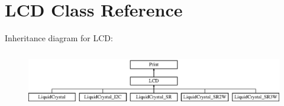 \hypertarget{class_l_c_d}{}\section{L\+C\+D Class Reference}
\label{class_l_c_d}
Inheritance diagram for L\+C\+D\+:\begin{figure}[H]
\begin{center}
\leavevmode
\includegraphics[height=2.507463cm]{class_l_c_d}
\end{center}
\end{figure}
